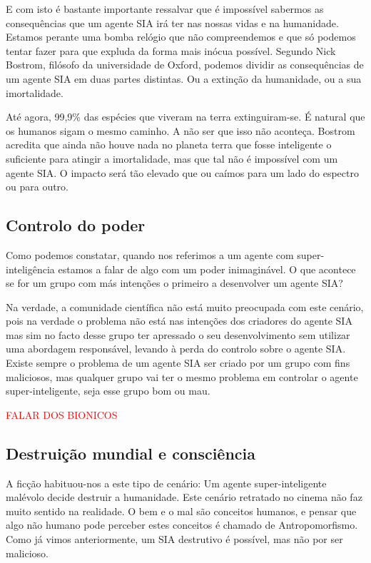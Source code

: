 \documentclass[runningheads,a4paper]{llncs}
\begin{document}
E com isto é bastante importante ressalvar que é impossível sabermos as consequências que um agente SIA irá ter nas nossas vidas e na humanidade. Estamos perante uma bomba relógio que não compreendemos e que só podemos tentar fazer para que expluda da forma mais inócua possível. Segundo Nick Bostrom, filósofo da universidade de Oxford, podemos dividir as consequências de um agente SIA em duas partes distintas. Ou a extinção da humanidade, ou a sua imortalidade.

Até agora, 99,9\% das espécies que viveram na terra extinguiram-se. É natural que os humanos sigam o mesmo caminho. A não ser que isso não aconteça. Bostrom acredita que ainda não houve nada no planeta terra que fosse inteligente o suficiente para atingir a imortalidade, mas que tal não é impossível com um agente SIA\@. O impacto será tão elevado que ou caímos para um lado do espectro ou para outro.

\subsection{Controlo do poder}

Como podemos constatar, quando nos referimos a um agente com super-inteligência estamos a falar de algo com um poder inimaginável. O que acontece se for um grupo com más intenções o primeiro a desenvolver um agente SIA?\@

Na verdade, a comunidade científica não está muito preocupada com este cenário, pois na verdade o problema não está nas intenções dos criadores do agente SIA mas sim no facto desse grupo ter apressado o seu desenvolvimento sem utilizar uma abordagem responsável, levando à perda do controlo sobre o agente SIA\@. Existe sempre o problema de um agente SIA ser criado por um grupo com fins maliciosos, mas qualquer grupo vai ter o mesmo problema em controlar o agente super-inteligente, seja esse grupo bom ou mau.

\textcolor{red}{FALAR DOS BIONICOS}

\subsection{Destruição mundial e consciência}

A ficção habituou-nos a este tipo de cenário: Um agente super-inteligente malévolo decide destruir a humanidade. Este cenário retratado no cinema não faz muito sentido na realidade. O bem e o mal são conceitos humanos, e pensar que algo não humano pode perceber estes conceitos é chamado de Antropomorfismo. Como já vimos anteriormente, um SIA destrutivo é possível, mas não por ser malicioso.
\end{document}
